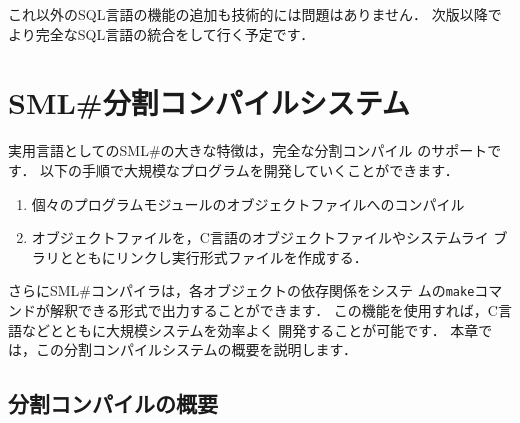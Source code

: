 \documentclass{jbook}
\newcommand{\smlsharp}{SML\#}
\begin{document}
	これ以外のSQL言語の機能の追加も技術的には問題はありません．
	次版以降でより完全なSQL言語の統合をして行く予定です．

\chapter{\smlsharp{}分割コンパイルシステム}
\label{chap:tutorialSeparatecompilation}

	実用言語としての\smlsharp{}の大きな特徴は，完全な分割コンパイル
のサポートです．
	以下の手順で大規模なプログラムを開発していくことができます．
\begin{enumerate}
\item 個々のプログラムモジュールのオブジェクトファイルへのコンパイル
\item オブジェクトファイルを，C言語のオブジェクトファイルやシステムライ
ブラリとともにリンクし実行形式ファイルを作成する．
\end{enumerate}
	さらに\smlsharp{}コンパイラは，各オブジェクトの依存関係をシステ
ムの{\tt make}コマンドが解釈できる形式で出力することができます．
	この機能を使用すれば，C言語などとともに大規模システムを効率よく
開発することが可能です．
	本章では，この分割コンパイルシステムの概要を説明します．

\section{分割コンパイルの概要}
\label{sec:tutorialSeparateCompilation}
\end{document}
